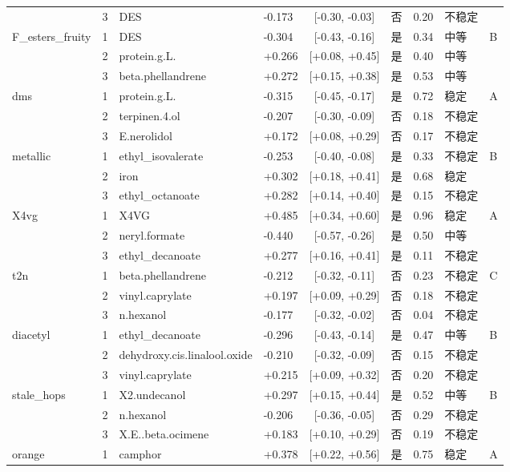 {\begin{longtable}{llllcccll}
 & 3 & DES & -0.173 & [-0.30, -0.03] & 否 & 0.20 & 不稳定 &  \\
F\_esters\_fruity & 1 & DES & -0.304 & [-0.43, -0.16] & 是 & 0.34 & 中等 & B \\
 & 2 & protein.g.L. & +0.266 & [+0.08, +0.45] & 是 & 0.40 & 中等 &  \\
 & 3 & beta.phellandrene & +0.272 & [+0.15, +0.38] & 是 & 0.53 & 中等 &  \\
dms & 1 & protein.g.L. & -0.315 & [-0.45, -0.17] & 是 & 0.72 & 稳定 & A \\
 & 2 & terpinen.4.ol & -0.207 & [-0.30, -0.09] & 否 & 0.18 & 不稳定 &  \\
 & 3 & E.nerolidol & +0.172 & [+0.08, +0.29] & 否 & 0.17 & 不稳定 &  \\
metallic & 1 & ethyl\_isovalerate & -0.253 & [-0.40, -0.08] & 是 & 0.33 & 不稳定 & B \\
 & 2 & iron & +0.302 & [+0.18, +0.41] & 是 & 0.68 & 稳定 &  \\
 & 3 & ethyl\_octanoate & +0.282 & [+0.14, +0.40] & 是 & 0.15 & 不稳定 &  \\
X4vg & 1 & X4VG & +0.485 & [+0.34, +0.60] & 是 & 0.96 & 稳定 & A \\
 & 2 & neryl.formate & -0.440 & [-0.57, -0.26] & 是 & 0.50 & 中等 &  \\
 & 3 & ethyl\_decanoate & +0.277 & [+0.16, +0.41] & 是 & 0.11 & 不稳定 &  \\
t2n & 1 & beta.phellandrene & -0.212 & [-0.32, -0.11] & 否 & 0.23 & 不稳定 & C \\
 & 2 & vinyl.caprylate & +0.197 & [+0.09, +0.29] & 否 & 0.18 & 不稳定 &  \\
 & 3 & n.hexanol & -0.177 & [-0.32, -0.02] & 否 & 0.04 & 不稳定 &  \\
diacetyl & 1 & ethyl\_decanoate & -0.296 & [-0.43, -0.14] & 是 & 0.47 & 中等 & B \\
 & 2 & dehydroxy.cis.linalool.oxide & -0.210 & [-0.32, -0.09] & 否 & 0.15 & 不稳定 &  \\
 & 3 & vinyl.caprylate & +0.215 & [+0.09, +0.32] & 否 & 0.20 & 不稳定 &  \\
stale\_hops & 1 & X2.undecanol & +0.297 & [+0.15, +0.44] & 是 & 0.52 & 中等 & B \\
 & 2 & n.hexanol & -0.206 & [-0.36, -0.05] & 否 & 0.29 & 不稳定 &  \\
 & 3 & X.E..beta.ocimene & +0.183 & [+0.10, +0.29] & 否 & 0.19 & 不稳定 &  \\
orange & 1 & camphor & +0.378 & [+0.22, +0.56] & 是 & 0.75 & 稳定 & A \\

\end{longtable}}
